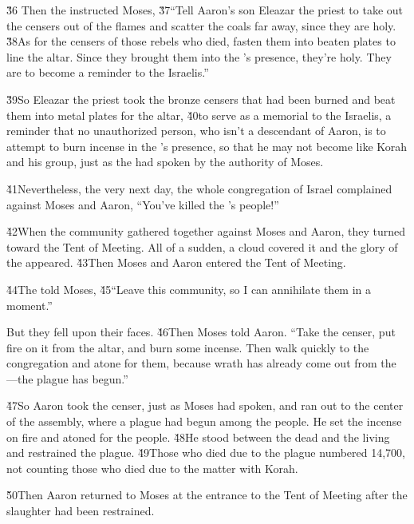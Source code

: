 \v{36} Then the  instructed Moses, \v{37}``Tell Aaron's son Eleazar the priest to take out the censers out of the flames and scatter the coals far away, since they are holy. \v{38}As for the censers of those rebels who died, fasten them into beaten plates to line the altar. Since they brought them into the 's presence, they're holy. They are to become a reminder to the Israelis.''

\v{39}So Eleazar the priest took the bronze censers that had been burned and beat them into metal plates for the altar, \v{40}to serve as a memorial to the Israelis, a reminder that no unauthorized person, who isn't a descendant of Aaron, is to attempt to burn incense in the 's presence, so that he may not become like Korah and his group, just as the  had spoken by the authority of Moses.

\v{41}Nevertheless, the very next day, the whole congregation of Israel complained against Moses and Aaron, ``You've killed the 's people!''

\v{42}When the community gathered together against Moses and Aaron, they turned toward the Tent of Meeting. All of a sudden, a cloud covered it and the glory of the  appeared. \v{43}Then Moses and Aaron entered the Tent of Meeting.

\v{44}The  told Moses, \v{45}``Leave this community, so I can annihilate them in a moment.''

But they fell upon their faces. \v{46}Then Moses told Aaron. ``Take the censer, put fire on it from the altar, and burn some incense. Then walk quickly to the congregation and atone for them, because wrath has already come out from the ---the plague has begun.''

\v{47}So Aaron took the censer, just as Moses had spoken, and ran out to the center of the assembly, where a plague had begun among the people. He set the incense on fire and atoned for the people. \v{48}He stood between the dead and the living and restrained the plague. \v{49}Those who died due to the plague numbered 14,700, not counting those who died due to the matter with Korah.

\v{50}Then Aaron returned to Moses at the entrance to the Tent of Meeting after the slaughter had been restrained.

